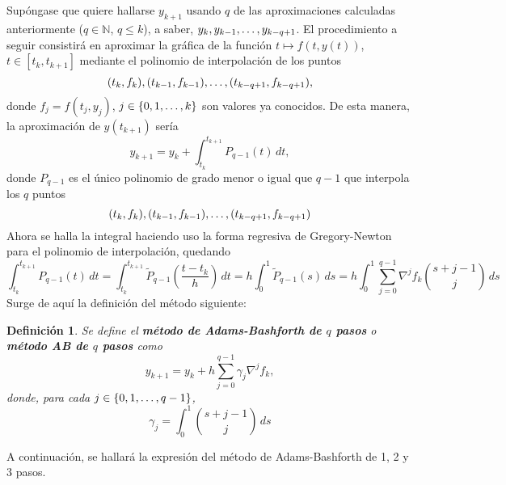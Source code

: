 \documentclass[11pt]{report}
\theoremstyle{mytheorem}
\theoremstyle{mydefinition}
\newtheorem{definition}{Definición}
\theoremstyle{myexample}
\newenvironment{cdefinition} %
  {\begin{mdframed}[
        linewidth=3pt,
        linecolor=c1,
        bottomline=false,
        topline=false,
        rightline=false,
        innerrightmargin=0pt,
        innertopmargin=0pt,
        innerbottommargin=0pt,
        innerleftmargin=1em, %
        skipabove=\baselineskip]
    \begin{definition}}
  {\end{definition}\end{mdframed}}
\newcommand{\N}{\mathbb N}
\newcommand{\mybf}[1]{\boldmath\textbf{\color{c1}#1}\unboldmath}
\begin{document}
Supóngase que quiere hallarse $y_{k+1}$ usando $q$ de las aproximaciones calculadas anteriormente ($q \in \N$, $q \leq k$), a saber, $y_k,y_{k-1},\mathellipsis,y_{k-q+1}$. El procedimiento a seguir consistirá en aproximar la gráfica de la función $t \mapsto f(t,y(t))$, $t \in [t_k,t_{k+1}]$ mediante el polinomio de interpolación de los puntos
\[(t_k,f_k), (t_{k-1},f_{k-1}), \mathellipsis, (t_{k-q+1}, f_{k-q+1}),\]
donde $f_j = f(t_j,y_j)$, $j \in \{0,1,\mathellipsis,k\}$ son valores ya conocidos. De esta manera, la aproximación de $y(t_{k+1})$ sería
\[y_{k+1}=y_k+\int_{t_k}^{t_{k+1}}P_{q-1}(t) \, dt,\]
donde $P_{q-1}$ es el único polinomio de grado menor o igual que $q-1$ que interpola los $q$ puntos
\[(t_k,f_k), (t_{k-1},f_{k-1}), \mathellipsis, (t_{k-q+1}, f_{k-q+1})\]
Ahora se halla la integral haciendo uso la forma regresiva de Gregory-Newton para el polinomio de interpolación, quedando
\[\int_{t_k}^{t_{k+1}}P_{q-1}(t) \, dt = \int_{t_k}^{t_{k+1}} \widetilde{P}_{q-1}\left(\frac{t-t_k}{h}\right) \, dt = h \int_0^1 \widetilde{P}_{q-1}(s) \, ds = h \int_0^1 \sum_{j=0}^{q-1}\nabla^jf_k\binom{s+j-1}{j} \, ds\]
Surge de aquí la definición del método siguiente:

\begin{cdefinition}
Se define el \mybf{método de Adams-Bashforth de $q$ pasos} o \mybf{método AB de $q$ pasos} como
\[y_{k+1}=y_k+h\sum_{j=0}^{q-1}\gamma_j\nabla^j f_k,\]
donde, para cada $j \in \{0,1,\mathellipsis,q-1\}$,
\[\gamma_j = \int_0^1 \binom{s+j-1}{j} \, ds\]

\end{cdefinition}

A continuación, se hallará la expresión del método de Adams-Bashforth de 1, 2 y 3 pasos.
\end{document}
